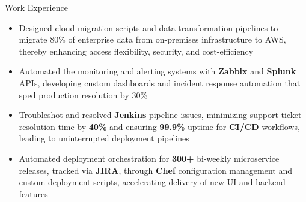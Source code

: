 \documentclass{resume}
\begin{document}
\begin{experienceSection}{Work Experience}
    \experienceItem[
        company={Cerner Healthcare},
        location={Bangalore, KA},
        position={Software Engineer},
        duration={May 2021 - Jul 2023}
    ]
    \begin{itemize}
        \itemsep -6pt {}
        \item Designed cloud migration scripts and data transformation pipelines to migrate 80\% of enterprise data from on-premises infrastructure to AWS, thereby enhancing access flexibility, security, and cost-efficiency
        \item Automated the monitoring and alerting systems with \textbf{Zabbix} and \textbf{Splunk} APIs, developing custom dashboards and incident response automation that sped production resolution by 30\%
        \item Troubleshot and resolved \textbf{Jenkins} pipeline issues, minimizing support ticket resolution time by \textbf{40\%} and ensuring \textbf{99.9\%} uptime for \textbf{CI/CD} workflows, leading to uninterrupted deployment pipelines
        \item Automated deployment orchestration for \textbf{300+} bi-weekly microservice releases, tracked via \textbf{JIRA}, through \textbf{Chef} configuration management and custom deployment scripts, accelerating delivery of new UI and backend features
    \end{itemize}

\end{experienceSection}
\end{document}
